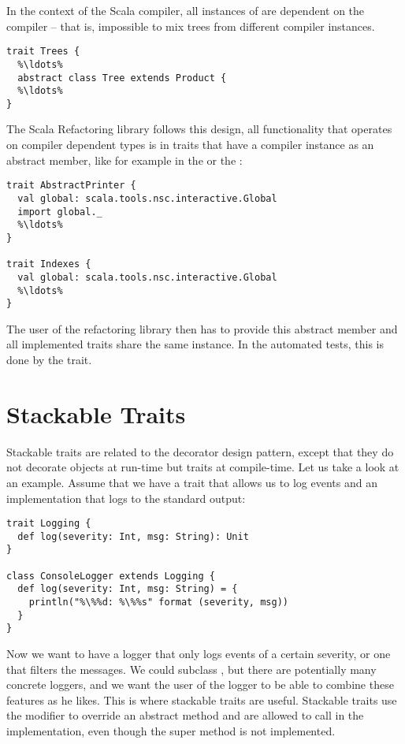 In the context of the Scala compiler, all instances of  are dependent on the compiler -- that is, impossible to mix trees from different compiler instances.

\begin{lstlisting}
trait Trees {
  %\ldots%
  abstract class Tree extends Product {
  %\ldots%
}
\end{lstlisting}

The Scala Refactoring library follows this design, all functionality that operates on compiler dependent types is in traits that have a compiler instance as an abstract member, like for example in the  or the :

\begin{lstlisting}
trait AbstractPrinter {
  val global: scala.tools.nsc.interactive.Global
  import global._
  %\ldots%
}

trait Indexes {
  val global: scala.tools.nsc.interactive.Global
  %\ldots%
}
\end{lstlisting}

The user of the refactoring library then has to provide this abstract member and all implemented traits share the same instance. In the automated tests, this is done by the  trait.

\section{Stackable Traits} \label{section:stackable-traits}

Stackable traits are related to the decorator design pattern, except that they do not decorate objects at run-time but traits at compile-time. Let us take a look at an example. Assume that we have a trait that allows us to log events and an implementation that logs to the standard output:

\begin{lstlisting}
trait Logging {
  def log(severity: Int, msg: String): Unit
}

class ConsoleLogger extends Logging {
  def log(severity: Int, msg: String) = {
    println("%\%%d: %\%%s" format (severity, msg))
  }
}
\end{lstlisting}

Now we want to have a logger that only logs events of a certain severity, or one that filters the messages. We could subclass , but there are potentially many concrete loggers, and we want the user of the logger to be able to combine these features as he likes. This is where stackable traits are useful. Stackable traits use the  modifier to override an abstract method and are allowed to call  in the implementation, even though the super method is not implemented.

